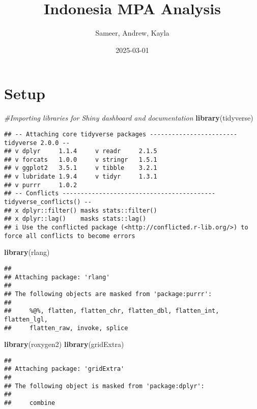 \documentclass[
]{article}
\title{Indonesia MPA Analysis}
\author{Sameer, Andrew, Kayla}
\date{2025-03-01}
\newenvironment{Shaded}{\begin{snugshade}}{\end{snugshade}}
\newcommand{\CommentTok}[1]{\textcolor[rgb]{0.56,0.35,0.01}{\textit{#1}}}
\newcommand{\FunctionTok}[1]{\textcolor[rgb]{0.13,0.29,0.53}{\textbf{#1}}}
\newcommand{\NormalTok}[1]{#1}
\begin{document}
\maketitle

\section{Setup}\label{setup}

\begin{Shaded}
\begin{Highlighting}[]
\CommentTok{\#Importing libraries for Shiny dashboard and documentation}
\FunctionTok{library}\NormalTok{(tidyverse)}
\end{Highlighting}
\end{Shaded}

\begin{verbatim}
## -- Attaching core tidyverse packages ------------------------ tidyverse 2.0.0 --
## v dplyr     1.1.4     v readr     2.1.5
## v forcats   1.0.0     v stringr   1.5.1
## v ggplot2   3.5.1     v tibble    3.2.1
## v lubridate 1.9.4     v tidyr     1.3.1
## v purrr     1.0.2     
## -- Conflicts ------------------------------------------ tidyverse_conflicts() --
## x dplyr::filter() masks stats::filter()
## x dplyr::lag()    masks stats::lag()
## i Use the conflicted package (<http://conflicted.r-lib.org/>) to force all conflicts to become errors
\end{verbatim}

\begin{Shaded}
\begin{Highlighting}[]
\FunctionTok{library}\NormalTok{(rlang)}
\end{Highlighting}
\end{Shaded}

\begin{verbatim}
## 
## Attaching package: 'rlang'
## 
## The following objects are masked from 'package:purrr':
## 
##     %@%, flatten, flatten_chr, flatten_dbl, flatten_int, flatten_lgl,
##     flatten_raw, invoke, splice
\end{verbatim}

\begin{Shaded}
\begin{Highlighting}[]
\FunctionTok{library}\NormalTok{(roxygen2)}
\FunctionTok{library}\NormalTok{(gridExtra)}
\end{Highlighting}
\end{Shaded}

\begin{verbatim}
## 
## Attaching package: 'gridExtra'
## 
## The following object is masked from 'package:dplyr':
## 
##     combine
\end{verbatim}
\end{document}
